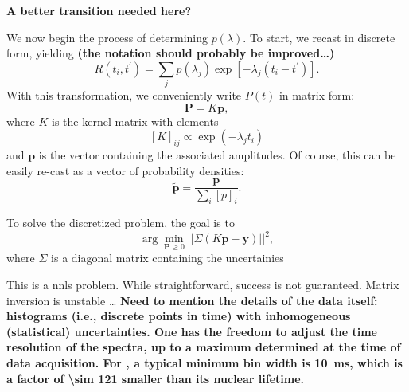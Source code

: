 \documentclass[
  aps,
  prb,
  twocolumn,
  reprint,
  superscriptaddress,
  floatfix,
  citeautoscript,
  longbibliography,
]{revtex4-2}
\newcommand{\latin}[1]{#1}
\begin{document}
\textbf{A better transition needed here?}


We now begin the process of determining $p ( \lambda )$.
To start, we recast  in discrete form, yielding
\textbf{(the notation should probably be improved\dots)}
\begin{equation} \label{eq:slr-sum}
   R \left (t_{i}, t^{\prime} \right ) = \sum_{j} p ( \lambda_{j} ) \exp \left [- \lambda_{j} \left ( t_{i} - t^{\prime} \right ) \right ] .
\end{equation}
With this transformation, we conveniently write $P(t)$ in matrix form:
\begin{equation} \label{eq:signal-matrix}
   \mathbf{P} = K \mathbf{p},
\end{equation}
where $K$ is the kernel matrix with elements
\begin{equation}
   \label{eq:kernel}
   [K]_{ij} \propto \exp \left ( - \lambda_{j} t_{i} \right )
\end{equation}
and $\mathbf{p}$ is the vector containing the associated amplitudes.
Of course, this can be easily re-cast as a vector of probability densities:
\begin{equation}
   \tilde{\mathbf{p}} = \frac{ \mathbf{p} }{ \sum_{i} [p]_{i} } .
\end{equation}



To solve the discretized problem, the goal is to
\begin{equation}
   \label{eq:onnls}
   \arg \min_{\mathbf{P} \geq 0} || \Sigma \left ( K \mathbf{p} - \mathbf{y} \right ) ||^{2} ,
\end{equation}
where $\Sigma$ is a diagonal matrix containing the uncertainies

This is a \gls{nnls} problem.
While straightforward, success is not guaranteed.
Matrix inversion is unstable \dots
\textbf{
Need to mention the details of the data itself:
histograms (\latin{i.e.}, discrete points in time) with inhomogeneous (statistical) uncertainties.
One has the freedom to adjust the time resolution of the spectra, up to a maximum determined at the time of data acquisition.
For , a typical minimum bin width is \SI{10}{\milli\second}, which is a factor of \num{\sim 121} smaller than its nuclear lifetime.
}
\end{document}
